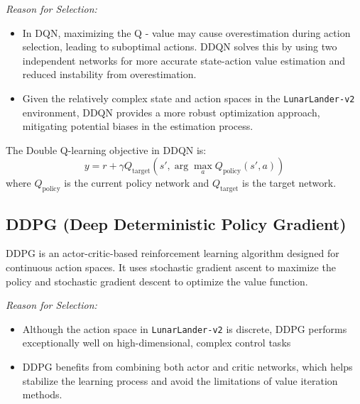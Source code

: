 \documentclass[conference]{IEEEtran}
\begin{document}
\par \textit{\quad Reason for Selection:}
\begin{itemize}
    \item In DQN, maximizing the Q - value may cause overestimation during action selection, leading to suboptimal actions. DDQN solves this by using two independent networks for more accurate state-action value estimation and reduced instability from overestimation.
    \item Given the relatively complex state and action spaces in the \texttt{LunarLander-v2} environment, DDQN provides a more robust optimization approach, mitigating potential biases in the estimation process.
\end{itemize}

The Double Q-learning objective in DDQN is:
\[
y = r + \gamma Q_{\text{target}}(s', \arg\max_a Q_{\text{policy}}(s', a))
\]
where \( Q_{\text{policy}} \) is the current policy network and \( Q_{\text{target}} \) is the target network.

\subsection{DDPG (Deep Deterministic Policy Gradient)}

DDPG is an actor-critic-based reinforcement learning algorithm designed for continuous action spaces. It uses stochastic gradient ascent to maximize the policy and stochastic gradient descent to optimize the value function.

\par \textit{\quad Reason for Selection:}
\begin{itemize}
    \item Although the action space in \texttt{LunarLander-v2} is discrete, DDPG performs exceptionally well on high-dimensional, complex control tasks%
    \item DDPG benefits from combining both actor and critic networks, which helps stabilize the learning process and avoid the limitations of value iteration methods.
\end{itemize}
\end{document}
